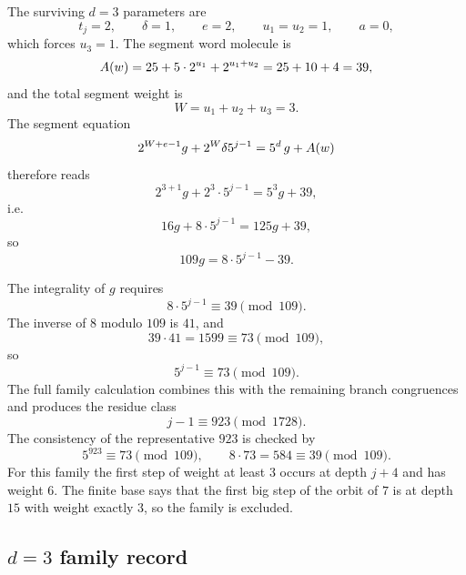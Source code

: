 The surviving $d=3$ parameters are
\begin{equation*}
  t_j=2,\qquad \delta=1,\qquad e=2,\qquad u_1=u_2=1,\qquad a=0,
\end{equation*}
which forces $u_3=1$.  The segment word molecule is
\begin{equation*}
  A(w)=25+5\cdot2^{u_1}+2^{u_1+u_2}
    =25+10+4=39,
\end{equation*}
and the total segment weight is
\begin{equation*}
  W=u_1+u_2+u_3=3.
\end{equation*}
The segment equation
\begin{equation*}
  2^{W+e-1}g+2^W\delta5^{j-1}
    =5^d\,g+A(w)
\end{equation*}
therefore reads
\begin{equation*}
  2^{3+1}g+2^3\cdot5^{j-1}
    =5^3g+39,
\end{equation*}
i.e.
\begin{equation*}
  16g+8\cdot5^{j-1}=125g+39,
\end{equation*}
so
\begin{equation*}
  109g=8\cdot5^{j-1}-39.
\end{equation*}

The integrality of $g$ requires
\begin{equation*}
  8\cdot5^{j-1}\equiv39\pmod{109}.
\end{equation*}
The inverse of $8$ modulo $109$ is $41$, and
\begin{equation*}
  39\cdot41=1599\equiv73\pmod{109},
\end{equation*}
so
\begin{equation*}
  5^{j-1}\equiv73\pmod{109}.
\end{equation*}
The full family calculation combines this with the remaining branch
congruences and produces the residue class
\begin{equation*}
  j-1\equiv923\pmod{1728}.
\end{equation*}
The consistency of the representative $923$ is checked by
\begin{equation*}
  5^{923}\equiv73\pmod{109},
  \qquad
  8\cdot73=584\equiv39\pmod{109}.
\end{equation*}
For this family the first step of weight at least $3$ occurs at depth
$j+4$ and has weight $6$.  The finite base says that the first big
step of the orbit of $7$ is at depth $15$ with weight exactly $3$, so
the family is excluded.

\subsection{$d=3$ family record}

